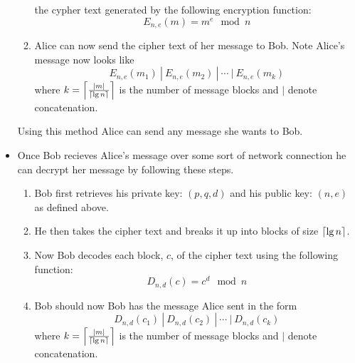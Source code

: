 \begin{definition}
\begin{itemize}
\begin{enumerate}
                            the cypher text generated by the following encryption function:
                            \begin{equation}
                                E_{n, e}(m) = m^e \mod n
                            \end{equation}
                        \item
                            Alice can now send the cipher text of her message to Bob. Note Alice's
                            message now looks like
                            \[
                                E_{n, e}(m_1) \ | \ E_{n, e}(m_2) \ | \ \cdots \ | \ E_{n, e}(m_k)
                            \]
                            where $k = \left\lceil \frac{\left|m\right|}{\left\lceil \lg n \right\rceil} \right\rceil$ is the number of message blocks
                            and $|$ denote concatenation.
                    \end{enumerate}
                    Using this method Alice can send any message she wants to Bob.
                \item
                    Once Bob recieves Alice's message over some sort of network connection
                    he can decrypt her message by following these steps.
                    \begin{enumerate}
                        \item
                            Bob first retrieves his private key: $(p, q, d)$ and his public key: $(n, e)$
                            as defined above.
                        \item   
                            He then takes the cipher text and breaks it up into blocks of size $\left\lceil \lg n \right\rceil$. 
                        \item
                            Now Bob decodes each block, $c$, of the cipher text using the following
                            function:
                            \[
                                D_{n, d}(c) = c^d \mod n
                            \]
                        \item
                            Bob should now Bob has the message Alice sent in the form
                            \[
                                D_{n, d}(c_1) \ | \ D_{n, d}(c_2) \ | \ \cdots \ | \ D_{n, d}(c_k)
                            \]
                            where $k = \left\lceil \frac{\left|m\right|}{\left\lceil \lg n \right\rceil} \right\rceil$ is the number of message blocks
                            and $|$ denote concatenation.
                    \end{enumerate}

\end{itemize}
\end{definition}
